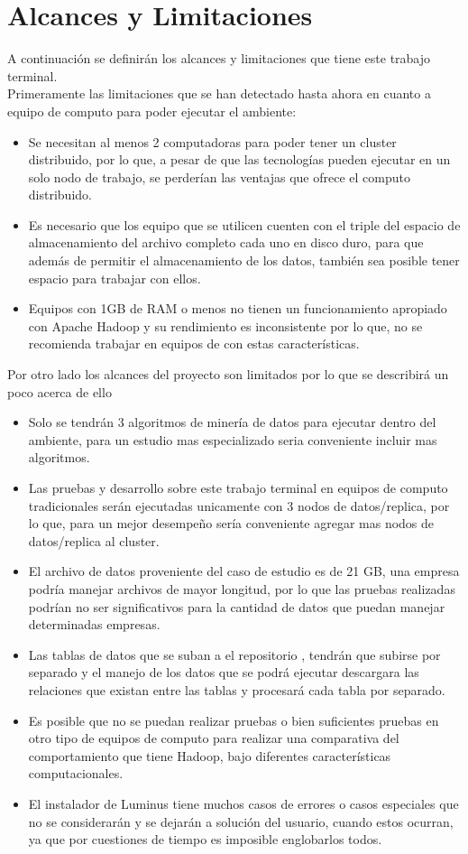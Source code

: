 \section{Alcances y Limitaciones}
A continuación se definirán los alcances y limitaciones que tiene este trabajo terminal.
\\ 
Primeramente las limitaciones que se han detectado hasta ahora en cuanto a equipo de computo para poder ejecutar el ambiente:
\begin{itemize}
	\item Se necesitan al menos 2 computadoras para poder tener un cluster distribuido, por lo que, a pesar de que las tecnologías pueden ejecutar en un solo nodo de trabajo, se perderían las ventajas que ofrece el computo distribuido.
	\item Es necesario que los equipo que se utilicen cuenten con el triple del espacio de almacenamiento del archivo completo cada uno en disco duro, para que además de permitir el almacenamiento de los datos, también sea posible tener espacio para trabajar con ellos.
	\item Equipos con 1GB de RAM o menos no tienen un funcionamiento apropiado con Apache Hadoop y su rendimiento es inconsistente por lo que, no se recomienda trabajar en equipos de con estas características.  
\end{itemize}
Por otro lado los alcances del proyecto son limitados por lo que se describirá un poco acerca de ello
\begin{itemize}
	\item Solo se tendrán 3 algoritmos de minería de datos para ejecutar dentro del ambiente, para un estudio mas especializado seria conveniente incluir mas algoritmos.
	\item Las pruebas y desarrollo sobre este trabajo terminal en equipos de computo tradicionales serán ejecutadas unicamente con 3 nodos de datos/replica, por lo que, para un mejor desempeño sería conveniente agregar mas nodos de datos/replica al cluster.
	\item El archivo de datos proveniente del caso de estudio es de 21 GB, una empresa podría manejar archivos de mayor longitud, por lo que las pruebas realizadas podrían no ser significativos para la cantidad de datos que puedan manejar determinadas empresas. 
	\item Las tablas de datos que se suban a el repositorio , tendrán que subirse por separado y el manejo de los datos que se podrá ejecutar descargara las relaciones que existan entre las tablas y procesará cada tabla por separado.
	\item Es posible que no se puedan realizar pruebas o bien suficientes pruebas en otro tipo de equipos de computo para realizar una comparativa del comportamiento que tiene Hadoop, bajo diferentes características computacionales.
	\item El instalador de Luminus tiene muchos casos de errores o casos especiales que no se considerarán y se dejarán a solución del usuario, cuando estos ocurran, ya que por cuestiones de tiempo es imposible englobarlos todos.
	 
\end{itemize}